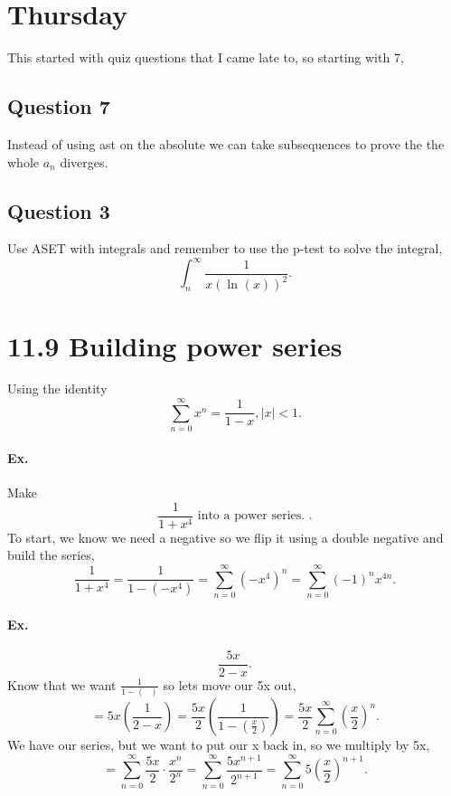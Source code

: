 \section{Thursday}%
\label{sec:Thursday}
This started with quiz questions that I came late to, so starting with 7, 
\subsection{Question 7}%
\label{sub:Question 7}
Instead of using ast on the absolute we can take subsequences to prove the the whole $ a_n $ diverges. 

\subsection{Question 3}%
\label{sub:Question 3}
Use ASET with integrals and remember to use the p-test to solve the integral,
\[
\int_{ n }^{ \infty } \frac{ 1 }{ x\left( \ln^{  } \left( x \right)  \right) ^2 } 
.\] 

\section*{11.9 Building power series}%
\label{sec:Building power series}
Using the identity
\[
\sum_{ n=0 } ^{ \infty } x^{ n } = \frac{ 1 }{ 1-x } , \left| x \right| < 1
.\] 
\paragraph{Ex.}
Make 
\[
\frac{ 1 }{ 1+x^{ 4 } } \text{ into a power series. }
.\] 
To start, we know we need a negative so we flip it using a double negative and build the series,
\[
\frac{ 1 }{ 1+x^{ 4 } } = \frac{ 1 }{ 1- \left( -x^{ 4 } \right) } = \sum_{ n=0 } ^{ \infty } \left( -x^{ 4 } \right) ^{ n } = \sum_{ n=0 } ^{ \infty } \left( -1 \right) ^{ n } x^{ 4n }
.\] 
\paragraph{Ex.}
\[
\frac{ 5x }{ 2-x } 
.\] 
Know that we want $ \frac{ 1 }{ 1-\left( \text{  } \right)  }  $ so lets move our 5x out,
\[
=5x\left( \frac{ 1 }{ 2-x }  \right) = \frac{ 5x }{ 2 } \left( \frac{ 1 }{ 1-\left( \frac{ x }{ 2 }  \right)  }  \right) = \frac{ 5x }{ 2 } \sum_{ n=0 } ^{ \infty } \left( \frac{ x }{ 2 }  \right) ^{ n }
.\] 
We have our series, but we want to put our x back in, so we multiply by 5x,
\[
=\sum_{ n=0 } ^{ \infty } \frac{ 5x }{ 2 } \cdot \frac{ x^{ n } }{ 2^{ n } }= \sum_{ n=0 } ^{ \infty } \frac{ 5x^{ n+1 } }{ 2^{ n+1 } }= \sum_{ n=0 } ^{ \infty } 5\left( \frac{ x }{ 2 }  \right) ^{ n+1 }
.\] 

